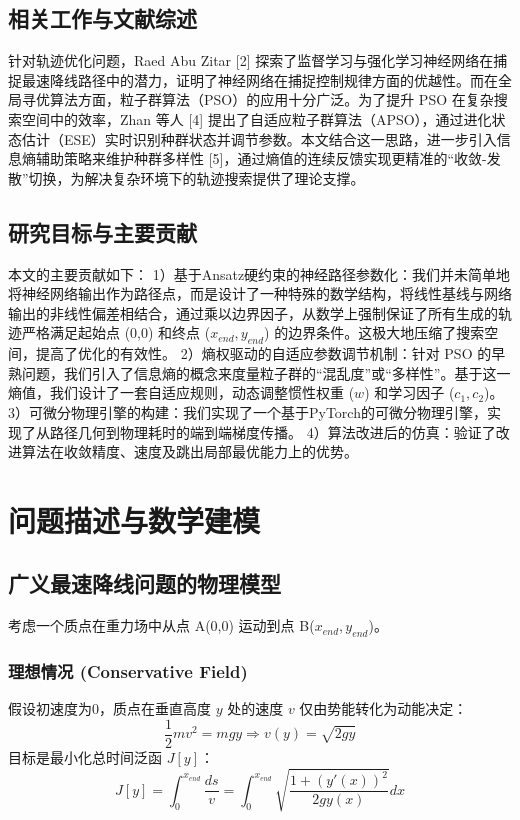 \documentclass[twocolumn, UTF8, a4paper]{ctexart}
\begin{document}
	\subsection{相关工作与文献综述}
	针对轨迹优化问题，Raed Abu Zitar [2] 探索了监督学习与强化学习神经网络在捕捉最速降线路径中的潜力，证明了神经网络在捕捉控制规律方面的优越性。而在全局寻优算法方面，粒子群算法（PSO）的应用十分广泛。为了提升 PSO 在复杂搜索空间中的效率，Zhan 等人 [4] 提出了自适应粒子群算法（APSO），通过进化状态估计（ESE）实时识别种群状态并调节参数。本文结合这一思路，进一步引入信息熵辅助策略来维护种群多样性 [5]，通过熵值的连续反馈实现更精准的“收敛-发散”切换，为解决复杂环境下的轨迹搜索提供了理论支撑。
	
	\subsection{研究目标与主要贡献}
	本文的主要贡献如下：
	1）基于Ansatz硬约束的神经路径参数化：我们并未简单地将神经网络输出作为路径点，而是设计了一种特殊的数学结构，将线性基线与网络输出的非线性偏差相结合，通过乘以边界因子，从数学上强制保证了所有生成的轨迹严格满足起始点 (0,0) 和终点 ($x_{end}, y_{end}$) 的边界条件。这极大地压缩了搜索空间，提高了优化的有效性。
	2）熵权驱动的自适应参数调节机制：针对 PSO 的早熟问题，我们引入了信息熵的概念来度量粒子群的“混乱度”或“多样性”。基于这一熵值，我们设计了一套自适应规则，动态调整惯性权重 ($w$) 和学习因子 ($c_1, c_2$)。
	3）可微分物理引擎的构建：我们实现了一个基于PyTorch的可微分物理引擎，实现了从路径几何到物理耗时的端到端梯度传播。
	4）算法改进后的仿真：验证了改进算法在收敛精度、速度及跳出局部最优能力上的优势。
	
	\section{问题描述与数学建模}
	
	\subsection{广义最速降线问题的物理模型}
	考虑一个质点在重力场中从点 A(0,0) 运动到点 B($x_{end}, y_{end}$)。
	
	\subsubsection{理想情况 (Conservative Field)}
	假设初速度为0，质点在垂直高度 $y$ 处的速度 $v$ 仅由势能转化为动能决定：
	\begin{equation}
		\frac{1}{2}mv^2 = mgy \Rightarrow v(y) = \sqrt{2gy}
	\end{equation}
	目标是最小化总时间泛函 $J[y]$：
	\begin{equation}
		J[y] = \int_0^{x_{end}} \frac{ds}{v} = \int_0^{x_{end}} \sqrt{\frac{1+(y'(x))^2}{2gy(x)}} dx
	\end{equation}
	
\end{document}

